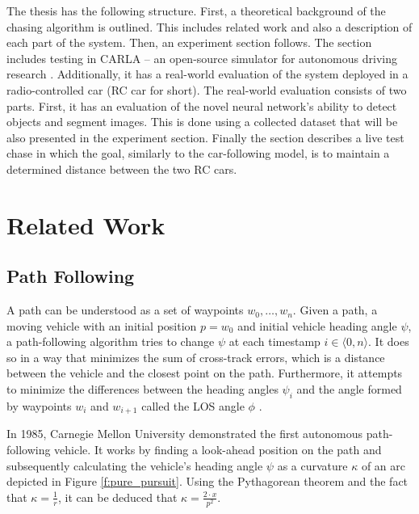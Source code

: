\documentclass{ctuthesis/ctuthesis}
\begin{document}
The thesis has the following structure. First, a theoretical background of the chasing algorithm is outlined. This includes related work and also a description of each part of the system. Then, an experiment section follows. The section includes testing in CARLA -- an open-source simulator for autonomous driving research \cite{CARLA}. Additionally, it has a real-world evaluation of the system deployed in a radio-controlled car (RC car for short). The real-world evaluation consists of two parts. First, it has an evaluation of the novel neural network's ability to detect objects and segment images. This is done using a collected dataset that will be also presented in the experiment section. Finally the section describes a live test chase in which the goal, similarly to the car-following model, is to maintain a determined distance between the two RC cars.




\chapter{Related Work}
\section{Path Following}
A path can be understood as a set of waypoints $w_0,\dots ,w_n$. Given a path, a moving vehicle with an initial position $p=w_0$ and initial vehicle heading angle $\psi$, a path-following algorithm tries to change $\psi$ at each timestamp $i \in \langle 0,n\rangle$. It does so in a way that minimizes the sum of cross-track errors, which is a distance between the vehicle and the closest point on the path. Furthermore, it attempts to minimize the differences between the heading angles $\psi_i$ and the angle formed by waypoints $w_i$ and $w_{i+1}$ called the LOS angle $\phi$ \cite{path_following_evaluation}.\par

In 1985, Carnegie Mellon University demonstrated the first autonomous path-following vehicle. It works by finding a look-ahead position on the path and subsequently calculating the vehicle's heading angle $\psi$ as a curvature $\kappa$ of an arc depicted in Figure \ref{f:pure_pursuit}. Using the Pythagorean theorem and the fact that $\kappa=\frac{1}{r}$, it can be deduced that $\kappa = \frac{2\cdot x}{p^2}$. \par
\end{document}
